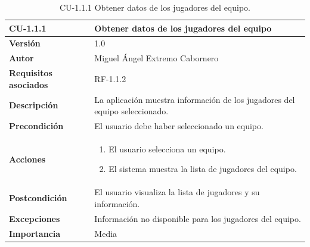 \begin{table}[p]
    \centering
    \begin{tabularx}{\linewidth}{ p{} p{} }
        \toprule
        \textbf{CU-1.1.1}    & \textbf{Obtener datos de los jugadores del equipo}\\
        \toprule
        \textbf{Versión}              & 1.0    \\
        \textbf{Autor}                & Miguel Ángel Extremo Cabornero \\
        \textbf{Requisitos asociados} & RF-1.1.2 \\
        \textbf{Descripción}          & La aplicación muestra información de los jugadores del equipo seleccionado. \\
        \textbf{Precondición}         & El usuario debe haber seleccionado un equipo. \\
        \textbf{Acciones}             &
        \begin{enumerate}
            \item El usuario selecciona un equipo.
            \item El sistema muestra la lista de jugadores del equipo.
        \end{enumerate}\\
        \textbf{Postcondición}        & El usuario visualiza la lista de jugadores y su información. \\
        \textbf{Excepciones}          & Información no disponible para los jugadores del equipo. \\
        \textbf{Importancia}          & Media \\
        \bottomrule
    \end{tabularx}
    \caption{CU-1.1.1 Obtener datos de los jugadores del equipo.}
\end{table}

